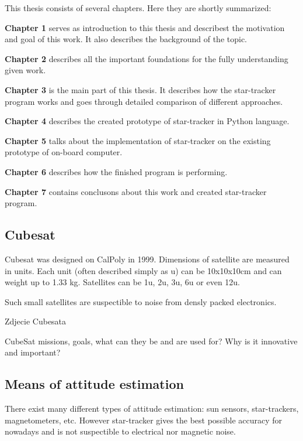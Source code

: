 \documentclass[12pt,a4paper,oneside]{article}
\begin{document}
This thesis consists of several chapters. Here they are shortly summarized:\par
\setlength{\parindent}{0cm}
\textbf{Chapter 1} serves as introduction to this thesis and describest the motivation and goal of this work. It also describes the background of the topic.\par
\textbf{Chapter 2} describes all the important foundations for the fully understanding given work.\par
\textbf{Chapter 3} is the main part of this thesis. It describes how the star-tracker program works and goes through detailed comparison of different approaches.\par
\textbf{Chapter 4} describes the created prototype of star-tracker in Python language.\par
\textbf{Chapter 5} talks about the implementation of star-tracker on the existing prototype of on-board computer.\par
\textbf{Chapter 6} describes how the finished program is performing.\par
\textbf{Chapter 7} contains conclusons about this work and created star-tracker program.\par

\setlength{\parindent}{1cm}

\subsection{Cubesat}


Cubesat was designed on CalPoly in 1999\cite{heidt2000cubesat}.
Dimensions of satellite are measured in units. Each unit (often described simply as u) can be 10x10x10cm and can weight up to 1.33 kg. Satellites can be 1u, 2u, 3u, 6u or even 12u.

Such small satellites are suspectible to noise from densly packed electronics.

Zdjecie Cubesata

CubeSat missions, goals, what can they be and are used for? Why is it innovative and important?

\subsection{Means of attitude estimation}

There exist many different types of attitude estimation: sun sensors, star-trackers, magnetometers, etc. However star-tracker gives the best possible accuracy for nowadays and is not suspectible to electrical nor magnetic noise.
\end{document}
